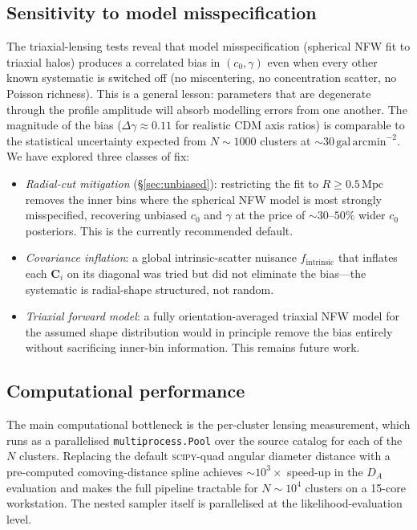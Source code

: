\documentclass[12pt,a4paper]{article}
\begin{document}
\subsection{Sensitivity to model misspecification}

The triaxial-lensing tests reveal that model misspecification (spherical NFW fit
to triaxial halos) produces a correlated bias in $(c_0, \gamma)$ even when every
other known systematic is switched off (no miscentering, no concentration scatter,
no Poisson richness).  This is a general lesson: parameters that are degenerate
through the profile amplitude will absorb modelling errors from one another.  The
magnitude of the bias ($\Delta\gamma\approx0.11$ for realistic CDM axis ratios)
is comparable to the
statistical uncertainty expected from $N\sim\!1000$ clusters at
$\sim30\,\mathrm{gal\,arcmin}^{-2}$.  We have explored three classes of fix:
\begin{itemize}
  \item \textit{Radial-cut mitigation} (§\ref{sec:unbiased}): restricting the
    fit to $R \ge 0.5\,\mathrm{Mpc}$ removes the inner bins where the spherical
    NFW model is most strongly misspecified, recovering unbiased $c_0$ and
    $\gamma$ at the price of $\sim\!30$--$50\%$ wider $c_0$ posteriors.  This is
    the currently recommended default.
  \item \textit{Covariance inflation}: a global intrinsic-scatter nuisance
    $f_\mathrm{intrinsic}$ that inflates each $\mathbf{C}_i$ on its diagonal was
    tried but did not eliminate the bias—the systematic is radial-shape
    structured, not random.
  \item \textit{Triaxial forward model}: a fully orientation-averaged triaxial
    NFW model for the assumed shape distribution
    \citep{Oguri2012,Corless2007,JingSuto2002} would in principle remove the
    bias entirely without sacrificing inner-bin information.  This remains
    future work.
\end{itemize}

\subsection{Computational performance}

The main computational bottleneck is the per-cluster lensing measurement, which
runs as a parallelised \texttt{multiprocess.Pool} over the source catalog for each
of the $N$ clusters.  Replacing the default \textsc{scipy}-quad angular diameter
distance with a pre-computed comoving-distance spline achieves $\sim\!10^3\times$
speed-up in the $D_A$ evaluation and makes the full pipeline tractable for
$N\sim\!10^4$ clusters on a 15-core workstation.  The nested sampler itself is
parallelised at the likelihood-evaluation level.
\end{document}
